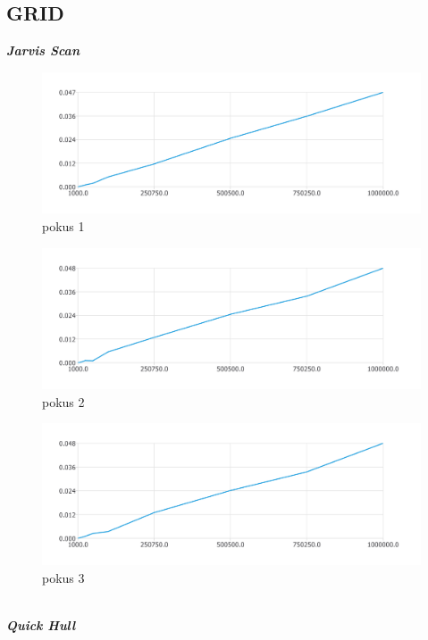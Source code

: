 \documentclass{article}
\begin{document}
\subsection{GRID}
\textit{\textbf {Jarvis Scan}}
\\
\begin{figure}[htbp]
\centering
        \includegraphics[clip, trim=0cm 0cm 0cm 0cm, width=1\textwidth]{pdf10.pdf}
        \caption{pokus 1}
\end{figure}
\begin{figure}[htbp]
\centering
        \includegraphics[clip, trim=0cm 0cm 0cm 0cm, width=1\textwidth]{pdf11.pdf}
        \caption{pokus 2}
\end{figure}
\begin{figure}[htbp]
\centering
        \includegraphics[clip, trim=0cm 0cm 0cm 0cm, width=1\textwidth]{pdf12.pdf}
        \caption{pokus 3}
\end{figure}
\\
\clearpage
\newpage
\textit{\textbf {Quick Hull}}
\\
\end{document}
